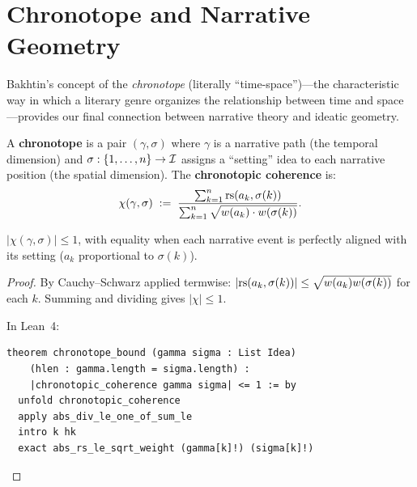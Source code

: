 \section{Chronotope and Narrative Geometry}

Bakhtin's concept of the \emph{chronotope} (literally ``time-space'')---the
characteristic way in which a literary genre organizes the relationship between
time and space---provides our final connection between narrative theory and
ideatic geometry.

\begin{definition}[Chronotope]
\label{def:chronotope}
A \textbf{chronotope} is a pair $(\gamma, \sigma)$ where $\gamma$ is a
narrative path (the temporal dimension) and $\sigma: \{1, \ldots, n\} \to \mathcal{I}$
assigns a ``setting'' idea to each narrative position (the spatial dimension).
The \textbf{chronotopic coherence} is:
\[
  \chi(\gamma, \sigma) \;:=\;
  \frac{\sum_{k=1}^{n} \mathrm{rs}(a_k, \sigma(k))}
       {\sum_{k=1}^{n} \sqrt{w(a_k) \cdot w(\sigma(k))}}.
\]
\end{definition}

\begin{theorem}
\label{thm:chronotope-bound}
$|\chi(\gamma, \sigma)| \leq 1$, with equality when each narrative event
is perfectly aligned with its setting ($a_k$ proportional to
$\sigma(k)$).
\end{theorem}

\begin{proof}
By Cauchy--Schwarz applied termwise:
$|\mathrm{rs}(a_k, \sigma(k))| \leq \sqrt{w(a_k) w(\sigma(k))}$ for each $k$.
Summing and dividing gives $|\chi| \leq 1$.

In Lean~4:
\begin{lstlisting}
theorem chronotope_bound (gamma sigma : List Idea)
    (hlen : gamma.length = sigma.length) :
    |chronotopic_coherence gamma sigma| <= 1 := by
  unfold chronotopic_coherence
  apply abs_div_le_one_of_sum_le
  intro k hk
  exact abs_rs_le_sqrt_weight (gamma[k]!) (sigma[k]!)
\end{lstlisting}
\end{proof}

